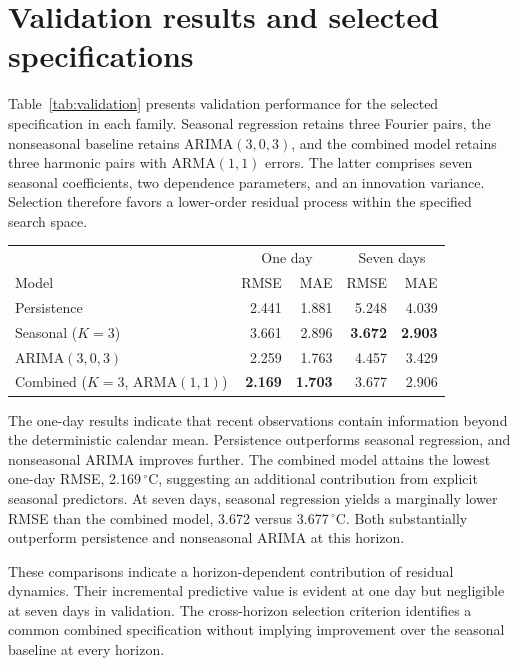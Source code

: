 \documentclass{article}
\begin{document}
\newpage
\section{Validation results and selected specifications}
Table~\ref{tab:validation} presents validation performance for the selected
specification in each family. Seasonal regression retains three Fourier pairs,
the nonseasonal baseline retains ARIMA$(3,0,3)$, and the combined model retains
three harmonic pairs with ARMA$(1,1)$ errors. The latter comprises seven
seasonal coefficients, two dependence parameters, and an innovation variance.
Selection therefore favors a lower-order residual process within the
specified search space.

\begin{center}
\label{tab:validation}
\begin{tabular}{lrrrr}
\toprule
& \multicolumn{2}{c}{One day} & \multicolumn{2}{c}{Seven days}\\
Model & RMSE & MAE & RMSE & MAE\\
\midrule
Persistence & 2.441 & 1.881 & 5.248 & 4.039\\
Seasonal ($K=3$) & 3.661 & 2.896 & \textbf{3.672} & \textbf{2.903}\\
ARIMA$(3,0,3)$ & 2.259 & 1.763 & 4.457 & 3.429\\
Combined ($K=3$, ARMA$(1,1)$) & \textbf{2.169} & \textbf{1.703} & 3.677 & 2.906\\
\bottomrule
\end{tabular}
\end{center}

The one-day results indicate that recent observations contain information
beyond the deterministic calendar mean. Persistence outperforms seasonal
regression, and nonseasonal ARIMA improves further. The combined model attains
the lowest one-day RMSE, 2.169\,$^\circ$C, suggesting an additional contribution
from explicit seasonal predictors. At seven days, seasonal regression yields
a marginally lower RMSE than the combined model, 3.672 versus
3.677\,$^\circ$C. Both substantially outperform persistence and nonseasonal
ARIMA at this horizon.

These comparisons indicate a horizon-dependent contribution of residual
dynamics. Their incremental predictive value is evident at one day but
negligible at seven days in validation. The cross-horizon selection criterion
identifies a common combined specification without implying improvement
over the seasonal baseline at every horizon.
\end{document}
